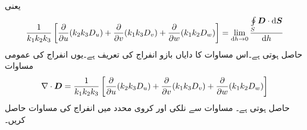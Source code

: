 یعنی
\begin{align*}
\frac{1}{k_1 k_2 k_3}\left[\frac{\partial }{\partial u} ( k_2 k_3  D_{u})+\frac{\partial }{\partial v} ( k_1 k_3  D_{v})+\frac{\partial }{\partial w} ( k_1 k_2  D_{w}) \right] =\lim_{\dif h \to 0}\frac{\oint\limits_{S} \kvec{D} \cdot \dif \kvec{S}}{\dif h}
\end{align*}
حاصل ہوتی ہے۔اس مساوات کا دایاں بازو انفراج کی تعریف ہے۔یوں انفراج کی عمومی مساوات
\begin{align}\label{مساوات_گاوس_پھیلاو_کی_عمومی_مساوات}
\nabla \cdot {\ensuremath{{\boldsymbol{D}}}}=\frac{1}{k_1 k_2 k_3}\left[\frac{\partial }{\partial u} ( k_2 k_3  D_{u})+\frac{\partial }{\partial v} ( k_1 k_3  D_{v})+\frac{\partial }{\partial w} ( k_1 k_2  D_{w}) \right] 
\end{align}
حاصل ہوتی ہے۔
مساوات  سے  نلکی اور کروی محدد میں انفراج کی مساوات حاصل کریں۔

